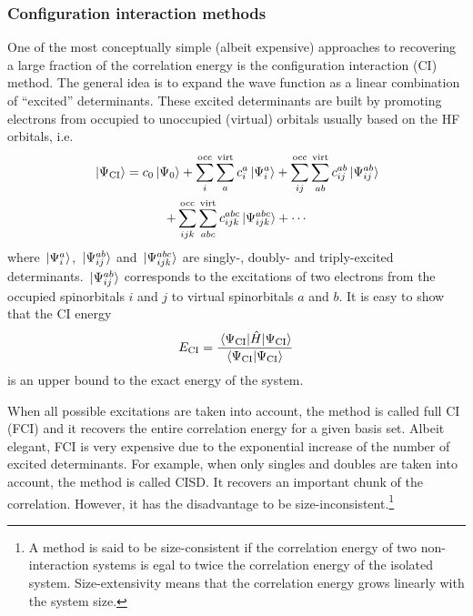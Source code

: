 \documentclass[aip,jcp,reprint,noshowkeys,superscriptaddress]{revtex4-1}
\begin{document}
\subsubsection*{Configuration interaction methods}
One of the most conceptually simple (albeit expensive) approaches to recovering a large fraction of the correlation energy is the configuration interaction (CI) method. \cite{SzaboBook,JensenBook,HelgakerBook}
The general idea is to expand the wave function as a linear combination of ``excited'' determinants.
These excited determinants are built by promoting electrons from occupied to unoccupied (virtual) orbitals usually based on the HF orbitals, i.e.
\begin{multline} 
\label{eq:Psi-CI}
	\ket*{\Psi_\text{CI}}	= 					c_0 	\ket*{\Psi_0} 
		+ \sum_i^{\text{occ}} \sum_a^{\text{virt}} 		c_{i}^{a} 	\ket*{\Psi_{i}^{a}} 
		+ \sum_{ij}^{\text{occ}} \sum_{ab}^{\text{virt}} 	c_{ij}^{ab} 	\ket*{\Psi_{ij}^{ab}}
		\\
		+ \sum_{ijk}^{\text{occ}} \sum_{abc}^{\text{virt}}	c_{ijk}^{abc} 	\ket*{\Psi_{ijk}^{abc}}
		+ \cdots
\end{multline}
where $\ket*{\Psi_{i}^{a}}$, $\ket*{\Psi_{ij}^{ab}}$ and $\ket*{\Psi_{ijk}^{abc}}$ are singly-, doubly- and triply-excited determinants.
$\ket*{\Psi_{ij}^{ab}}$ corresponds to the excitations of two electrons from the occupied spinorbitals $i$ and $j$ to virtual spinorbitals $a$ and $b$. 
It is easy to show that the CI energy
\begin{equation}
	E_\text{CI} = \frac{\mel{\Psi_\text{CI}}{\Hat{H}}{\Psi_\text{CI}}}{\braket{\Psi_\text{CI}}{\Psi_\text{CI}}}
\end{equation}
is an upper bound to the exact energy of the system.

When all possible excitations are taken into account, the method is called full CI (FCI) and it recovers the entire correlation energy for a given basis set.
Albeit elegant, FCI is very expensive due to the exponential increase of the number of excited determinants.
For example, when only singles and doubles are taken into account, the method is called CISD. 
It recovers an important chunk of the correlation.
However, it has the disadvantage to be size-inconsistent.\footnote{A method is said to be size-consistent if the correlation energy of two non-interaction systems is egal to twice the correlation energy of the isolated system.
Size-extensivity means that the correlation energy grows linearly with the system size.}
\end{document}
